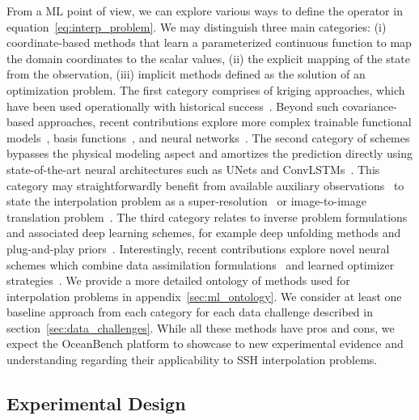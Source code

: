 From a ML point of view, we can explore various ways to define the operator in equation~\eqref{eq:interp_problem}. 
We may distinguish three main categories: (i) coordinate-based methods that learn a parameterized continuous function to map the domain coordinates to the scalar values, (ii) the explicit mapping of the state from the observation, (iii) implicit methods defined as the solution of an optimization problem. 
The first category comprises of kriging approaches, which have been used operationally with historical success~\cite{KRIGINGREVIEW,DUACS}. Beyond such covariance-based approaches, recent contributions explore more complex trainable functional models~\cite{GPsBIGDATA}, basis functions~\cite{MIOST}, and neural networks~\cite{NERFSSSH}. 
The second category of schemes bypasses the physical modeling aspect and amortizes the prediction directly using state-of-the-art neural architectures such as UNets and ConvLSTMs~\cite{SSHInterpAttention, SSHInterpConvLSTM, SSHInterpUNet}. 
This category may straightforwardly benefit from available auxiliary observations~\citep{CDSOBSSST,CDSOBSSSTENS,CDSOBSOC} 
to state the interpolation problem as a super-resolution~\cite{SuperResSurvey} or image-to-image translation problem~\cite{IMAGE2IMAGETRANSLATION, IMAGE2IMAGETRANSLATION2}. 
The third category relates to inverse problem formulations and associated deep learning schemes, for example deep unfolding methods and plug-and-play priors~\cite{DEEPUNFOLDING}. 
Interestingly, recent contributions explore novel neural schemes which combine data assimilation formulations~\cite{DAGEOSCIENCE} and learned optimizer strategies~\cite{4DVARNETSWOT,4DVARNETSST}.
We provide a more detailed ontology of methods used for interpolation problems in appendix~\ref{sec:ml_ontology}. 
We consider at least one baseline approach from each category for each data challenge described in section~\ref{sec:data_challenges}. 
While all these methods have pros and cons, we expect the OceanBench platform to showcase to new experimental evidence and understanding regarding their applicability to SSH interpolation problems.
 

\subsection{Experimental Design} \label{sec:experimental_design}

